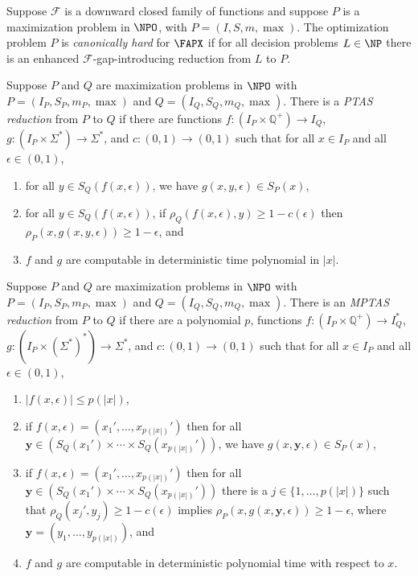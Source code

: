 \documentclass{article}
\begin{document}
\begin{definition}\label{def:canonicallyhard}
  Suppose $\mathcal{F}$ is a downward closed family of functions and suppose $P$ is a maximization problem in $\NPO$, with $P = (I, S, m, \max)$.
  The optimization problem $P$ is \emph{canonically hard} for $\FAPX$ if for all decision problems $L \in \NP$ there is an enhanced $\mathcal{F}$-gap-introducing reduction from $L$ to $P$.
\end{definition}

\begin{definition}\label{def:ptasreduction}
  Suppose $P$ and $Q$ are maximization problems in $\NPO$ with $P = (I_P, S_P, m_P, \max)$ and $Q = (I_Q, S_Q, m_Q, \max)$.
  There is a \emph{PTAS reduction} from $P$ to $Q$ if there are functions $f \colon \left(I_P \times \mathbb{Q}^+\right) \to I_Q$, $g \colon \left(I_P \times \Sigma^* \right) \to \Sigma^*$, and $c \colon (0, 1) \to (0, 1)$ such that for all $x \in I_P$ and all $\epsilon \in (0, 1)$,
  \begin{enumerate}
  \item for all $y \in S_Q(f(x, \epsilon))$, we have $g(x, y, \epsilon) \in S_P(x)$,
  \item for all $y \in S_Q(f(x, \epsilon))$, if $\rho_Q(f(x, \epsilon), y) \geq 1 - c(\epsilon)$ then $\rho_P(x, g(x, y, \epsilon)) \geq 1 - \epsilon$, and
  \item $f$ and $g$ are computable in deterministic time polynomial in $|x|$.
  \end{enumerate}
\end{definition}

\begin{definition}\label{def:mptasreduction}
  Suppose $P$ and $Q$ are maximization problems in $\NPO$ with $P = (I_P, S_P, m_P, \max)$ and $Q = (I_Q, S_Q, m_Q, \max)$.
  There is an \emph{MPTAS reduction} from $P$ to $Q$ if there are a polynomial $p$, functions $f \colon \left(I_P \times \mathbb{Q}^+\right) \to I_Q^*$, $g \colon \left(I_P \times {\left(\Sigma^*\right)}^* \right) \to \Sigma^*$, and $c \colon (0, 1) \to (0, 1)$ such that for all $x \in I_P$ and all $\epsilon \in (0, 1)$,
  \begin{enumerate}
  \item $|f(x, \epsilon)| \leq p(|x|)$,
  \item if $f(x, \epsilon) = (x_1', \dotsc, x_{p(|x|)}')$ then for all $\mathbf{y} \in (S_Q(x_1') \times \dotsb \times S_Q(x_{p(|x|)}'))$, we have $g(x, \mathbf{y}, \epsilon) \in S_P(x)$,
  \item if $f(x, \epsilon) = (x_1', \dotsc, x_{p(|x|)}')$ then for all $\mathbf{y} \in (S_Q(x_1') \times \dotsb \times S_Q(x_{p(|x|)}'))$ there is a $j \in \{1, \dotsc, p(|x|)\}$ such that $\rho_Q(x_j', y_j) \geq 1 - c(\epsilon)$ implies $\rho_P(x, g(x, \mathbf{y}, \epsilon)) \geq 1 - \epsilon$, where $\mathbf{y} = (y_1, \dotsc, y_{p(|x|)})$, and
  \item $f$ and $g$ are computable in deterministic polynomial time with respect to $x$.
  \end{enumerate}
\end{definition}
\end{document}
